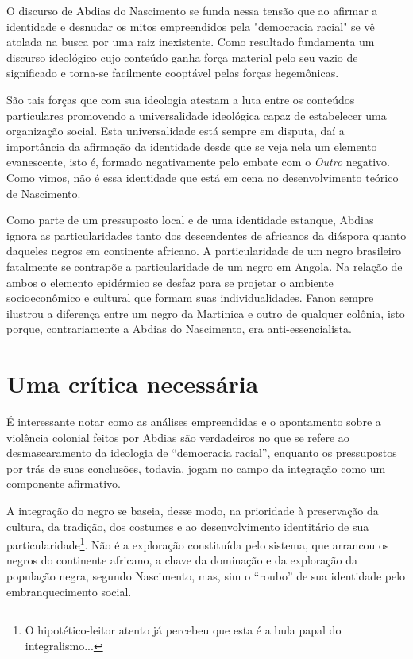 O discurso de Abdias do Nascimento se funda nessa tensão que ao afirmar
a identidade e desnudar os mitos empreendidos pela "democracia racial"
se vê atolada na busca por uma raiz inexistente. Como resultado
fundamenta um discurso ideológico cujo conteúdo ganha força material
pelo seu vazio de significado e torna-se facilmente cooptável pelas
forças hegemônicas.

São tais forças que com sua ideologia atestam a luta entre os conteúdos
particulares promovendo a universalidade ideológica capaz de estabelecer
uma organização social. Esta universalidade está sempre em disputa, daí
a importância da afirmação da identidade desde que se veja nela um
elemento evanescente, isto é, formado negativamente pelo embate com o
\emph{Outro} negativo. Como vimos, não é essa identidade que está em
cena no desenvolvimento teórico de Nascimento.

Como parte de um pressuposto local e de uma identidade estanque, Abdias
ignora as particularidades tanto dos descendentes de africanos da
diáspora quanto daqueles negros em continente africano. A
particularidade de um negro brasileiro fatalmente se contrapõe a
particularidade de um negro em Angola. Na relação de ambos o elemento
epidérmico se desfaz para se projetar o ambiente socioeconômico e
cultural que formam suas individualidades. Fanon sempre ilustrou a
diferença entre um negro da Martinica e outro de qualquer colônia, isto
porque, contrariamente a Abdias do Nascimento, era anti-essencialista.

\chapter{Uma crítica necessária}

É interessante notar como as análises empreendidas e o apontamento sobre
a violência colonial feitos por Abdias são verdadeiros no que se refere
ao desmascaramento da ideologia de ``democracia racial'', enquanto os
pressupostos por trás de suas conclusões, todavia, jogam no campo da
integração como um componente afirmativo.

A integração do negro se baseia, desse modo, na prioridade à preservação
da cultura, da tradição, dos costumes e ao desenvolvimento identitário
de sua particularidade\footnote{O hipotético-leitor atento já percebeu
  que esta é a bula papal do integralismo...}. Não é a exploração
constituída pelo sistema, que arrancou os negros do continente africano,
a chave da dominação e da exploração da população negra, segundo
Nascimento, mas, sim o ``roubo'' de sua identidade pelo embranquecimento
social.

